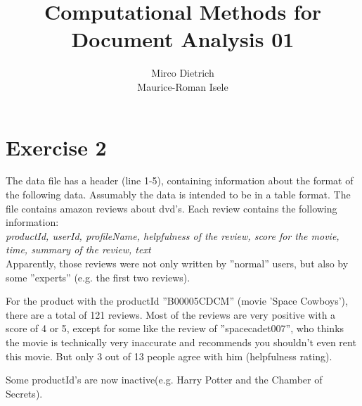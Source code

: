 \documentclass{article}
\title{Computational Methods for Document Analysis 01}
\author{Mirco Dietrich\\ Maurice-Roman Isele}
\begin{document}
\maketitle
\section*{Exercise 2}

The data file has a header (line 1-5), containing information about the format of the following data. Assumably the data is intended to be in a table format. The file contains amazon reviews about dvd's. Each review contains the following information: \\

\textit{productId, userId, profileName, helpfulness of the review, score for the movie, time, summary of the review, text} \\

\noindent Apparently, those reviews were not only written by ''normal'' users, but also by some ''experts'' (e.g. the first two reviews). 

For the product with the productId ''B00005CDCM'' (movie 'Space Cowboys'), there are a total of 121 reviews. Most of the reviews are very positive with a score of 4 or 5, except for some like the review of ''spacecadet007'', who thinks the movie is technically very inaccurate and recommends you shouldn't even rent this movie. But only 3 out of 13 people agree with him (helpfulness rating).

Some productId's are now inactive(e.g. Harry Potter and the Chamber of Secrets).
\end{document}
